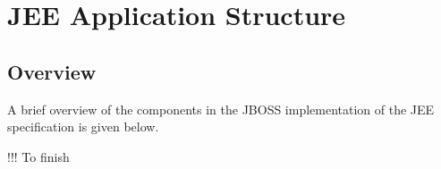 \chapter{JEE Application Structure}

\section*{Overview}
A brief overview of the components in the JBOSS implementation of the JEE specification is given below. 

!!! To finish